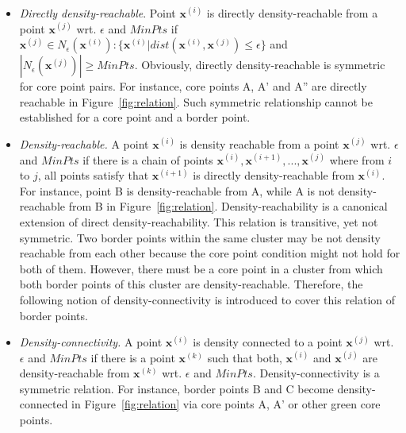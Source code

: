 \begin{itemize}
\item \textit{Directly density-reachable}.  
Point $\mathbf{x}^{(i)}$ 
is directly density-reachable from a point $\mathbf{x}^{(j)}$ wrt. $\epsilon$ and 
$MinPts$ if $\mathbf{x}^{(j)} 
\in  \mathit{N_{\epsilon}(\mathbf{x}^{(i)}):\{\mathbf{x}^{(i)}| 
	dist(\mathbf{x}^{(i)}, \mathbf{x}^{(j)})\leq \epsilon\}}$ and 
$|N_{\epsilon}(\mathbf{x}^{(j)})| \geq MinPts$. Obviously, directly 
density-reachable is symmetric for core point pairs. For instance, core points A, A' and A'' are directly reachable in Figure~\ref{fig:relation}. 
Such symmetric relationship cannot be established for a core point and a border point. 

\item \textit{Density-reachable.} A point $\mathbf{x}^{(i)}$ is density reachable from a point $\mathbf{x}^{(j)}$ wrt. 
$\epsilon$ and $MinPts$  if there is a chain of points $\mathbf{x}^{(i)}, \mathbf{x}^{(i+1)}, ..., \mathbf{x}^{(j)}$ where from $i$ to $j$, all points satisfy that $\mathbf{x}^{(i+1)}$ is directly density-reachable from $\mathbf{x}^{(i)}$. For instance, point B is density-reachable from A, while A is not density-reachable from B in Figure~\ref{fig:relation}. Density-reachability is a canonical extension of direct density-reachability. This relation is transitive, yet not symmetric. Two 
border points within the same cluster may be not density reachable from each other because the core point condition might not hold for both of them. However, there must be a core point in a cluster from which both border points of this cluster are density-reachable. Therefore, the following notion of density-connectivity is introduced to cover this relation of border points.

\item \textit{Density-connectivity.}  A point $\mathbf{x}^{(i)}$ is density connected to a point $\mathbf{x}^{(j)}$ wrt. $\epsilon$ and $MinPts$ if there is a point $\mathbf{x}^{(k)}$ such that both, $\mathbf{x}^{(i)}$ and $\mathbf{x}^{(j)}$ are 
density-reachable from $\mathbf{x}^{(k)}$ wrt. $\epsilon$ and $MinPts$. Density-connectivity is a symmetric relation. For instance, border points B and C become density-connected in Figure~\ref{fig:relation} via core points A, A' or other green core points. 
\end{itemize}

